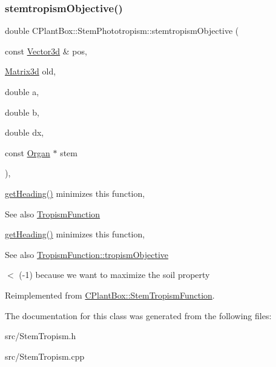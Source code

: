 \subsubsection{\texorpdfstring{stemtropism\+Objective()}{stemtropismObjective()}}
{\footnotesize\ttfamily double C\+Plant\+Box\+::\+Stem\+Phototropism\+::stemtropism\+Objective (\begin{DoxyParamCaption}\item[{const \hyperlink{classCPlantBox_1_1Vector3d}{Vector3d} \&}]{pos,  }\item[{\hyperlink{classCPlantBox_1_1Matrix3d}{Matrix3d}}]{old,  }\item[{double}]{a,  }\item[{double}]{b,  }\item[{double}]{dx,  }\item[{const \hyperlink{classCPlantBox_1_1Organ}{Organ} $\ast$}]{stem }\end{DoxyParamCaption})\hspace{0.3cm}{\ttfamily [override]}, {\ttfamily [virtual]}}



\hyperlink{classCPlantBox_1_1StemTropismFunction_ac72f7ad1200d1defbb3c9b20e20d1f62}{get\+Heading()} minimizes this function, 

\begin{DoxySeeAlso}{See also}
\hyperlink{classCPlantBox_1_1TropismFunction}{Tropism\+Function}
\end{DoxySeeAlso}
\hyperlink{classCPlantBox_1_1StemTropismFunction_ac72f7ad1200d1defbb3c9b20e20d1f62}{get\+Heading()} minimizes this function, \begin{DoxySeeAlso}{See also}
\hyperlink{classCPlantBox_1_1TropismFunction_a4f2c79fff55d1398c98a070dd8ebbe08}{Tropism\+Function\+::tropism\+Objective} 
\end{DoxySeeAlso}
$<$ (-\/1) because we want to maximize the soil property 

Reimplemented from \hyperlink{classCPlantBox_1_1StemTropismFunction_a86dc37330cbec72042352dcce88756ae}{C\+Plant\+Box\+::\+Stem\+Tropism\+Function}.



The documentation for this class was generated from the following files\+:\begin{DoxyCompactItemize}
\item 
src/Stem\+Tropism.\+h\item 
src/Stem\+Tropism.\+cpp\end{DoxyCompactItemize}
